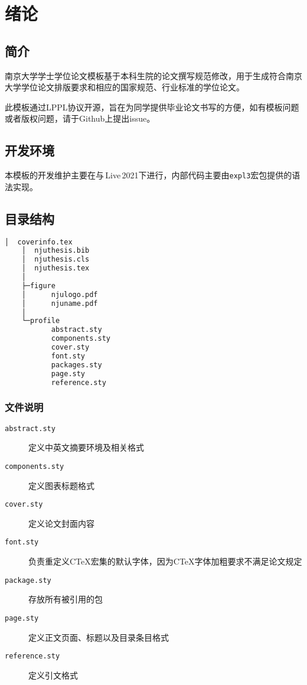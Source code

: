 \chapter{绪论}

\section{简介}
南京大学学士学位论文模板\cite{njuthesis}基于本科生院的论文撰写规范修改，用于生成符合南京大学学位论文排版要求和相应的国家规范、行业标准的学位论文。

此模板通过LPPL协议开源，旨在为同学提供毕业论文书写的方便，如有模板问题或者版权问题，请于Github上提出issue。

\section{开发环境}

本模板的开发维护主要在与\,Live\,2021下进行，内部代码主要由\lstinline|expl3|宏包提供的语法实现。

\section{目录结构}
\label{sec:directory}

\begin{lstlisting}[language=bash]
    │  coverinfo.tex
    │  njuthesis.bib
    │  njuthesis.cls
    │  njuthesis.tex
    │
    ├─figure
    │      njulogo.pdf
    │      njuname.pdf
    │
    └─profile
           abstract.sty
           components.sty
           cover.sty
           font.sty
           packages.sty
           page.sty
           reference.sty
\end{lstlisting}

\subsection{文件说明}
\begin{description}
    \item [\texttt{abstract.sty}] 定义中英文摘要环境及相关格式
    \item [\texttt{components.sty}] 定义图表标题格式
    \item [\texttt{cover.sty}] 定义论文封面内容
    \item [\texttt{font.sty}] 负责重定义CTeX宏集的默认字体，因为CTeX字体加粗要求不满足论文规定
    \item [\texttt{package.sty}] 存放所有被引用的包
    \item [\texttt{page.sty}] 定义正文页面、标题以及目录条目格式
    \item [\texttt{reference.sty}] 定义引文格式
\end{description}

